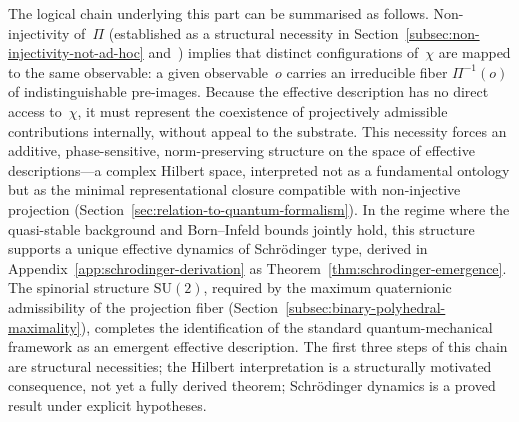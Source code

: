   The logical chain underlying this part can be summarised as follows.
  Non-injectivity of~$\Pi$ (established as a structural necessity in
  Section~\ref{subsec:non-injectivity-not-ad-hoc} and~\cite[Thm.~3]{Beau2026l}) implies that distinct configurations
  of~$\chi$ are mapped to the same observable: a given observable~$o$ carries
  an irreducible fiber $\Pi^{-1}(o)$ of indistinguishable pre-images.
  Because the effective description has no direct access to~$\chi$, it must represent
  the coexistence of projectively admissible contributions internally, without appeal
  to the substrate.
  This necessity forces an additive, phase-sensitive, norm-preserving structure on the
  space of effective descriptions---a complex Hilbert space, interpreted not as a
  fundamental ontology but as the minimal representational closure compatible with
  non-injective projection (Section~\ref{sec:relation-to-quantum-formalism}).
  In the regime where the quasi-stable background and Born--Infeld bounds jointly hold,
  this structure supports a unique effective dynamics of Schr\"odinger type, derived in
  Appendix~\ref{app:schrodinger-derivation} as Theorem~\ref{thm:schrodinger-emergence}.
  The spinorial structure $\mathrm{SU}(2)$, required by the maximum quaternionic
  admissibility of the projection fiber
  (Section~\ref{subsec:binary-polyhedral-maximality}), completes the identification
  of the standard quantum-mechanical framework as an emergent effective description.
  The first three steps of this chain are structural necessities; the Hilbert
  interpretation is a structurally motivated consequence, not yet a fully derived
  theorem; Schr\"odinger dynamics is a proved result under explicit hypotheses.

  \clearpage
  
